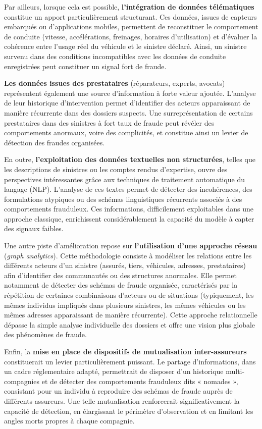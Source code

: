 Par ailleurs, lorsque cela est possible, \textbf{l'intégration de données télématiques} constitue un apport particulièrement structurant. Ces données, issues de capteurs embarqués ou d'applications mobiles, permettent de reconstituer le comportement de conduite (vitesse, accélérations, freinages, horaires d'utilisation) et d'évaluer la cohérence entre l'usage réel du véhicule et le sinistre déclaré. Ainsi, un sinistre survenu dans des conditions incompatibles avec les données de conduite enregistrées peut constituer un signal fort de fraude.

\textbf{Les données issues des prestataires} (réparateurs, experts, avocats) représentent également une source d'information à forte valeur ajoutée. L'analyse de leur historique d'intervention permet d'identifier des acteurs apparaissant de manière récurrente dans des dossiers suspects. Une surreprésentation de certains prestataires dans des sinistres à fort taux de fraude peut révéler des comportements anormaux, voire des complicités, et constitue ainsi un levier de détection des fraudes organisées.

En outre, \textbf{l'exploitation des données textuelles non structurées}, telles que les descriptions de sinistres ou les comptes rendus d'expertise, ouvre des perspectives intéressantes grâce aux techniques de traitement automatique du langage (NLP). L'analyse de ces textes permet de détecter des incohérences, des formulations atypiques ou des schémas linguistiques récurrents associés à des comportements frauduleux. Ces informations, difficilement exploitables dans une approche classique, enrichissent considérablement la capacité du modèle à capter des signaux faibles.

Une autre piste d'amélioration repose sur \textbf{l'utilisation d'une approche réseau} (\textit{graph analytics}). Cette méthodologie consiste à modéliser les relations entre les différents acteurs d'un sinistre (assurés, tiers, véhicules, adresses, prestataires) afin d'identifier des communautés ou des structures anormales. Elle permet notamment de détecter des schémas de fraude organisée, caractérisés par la répétition de certaines combinaisons d'acteurs ou de situations (typiquement, les mêmes individus impliqués dans plusieurs sinistres, les mêmes véhicules ou les mêmes adresses apparaissant de manière récurrente). Cette approche relationnelle dépasse la simple analyse individuelle des dossiers et offre une vision plus globale des phénomènes de fraude.

Enfin, la \textbf{mise en place de dispositifs de mutualisation inter-assureurs} constituerait un levier particulièrement puissant. Le partage d'informations, dans un cadre réglementaire adapté, permettrait de disposer d'un historique multi-compagnies et de détecter des comportements frauduleux dits « nomades », consistant pour un individu à reproduire des schémas de fraude auprès de différents assureurs. Une telle mutualisation renforcerait significativement la capacité de détection, en élargissant le périmètre d'observation et en limitant les angles morts propres à chaque compagnie.

